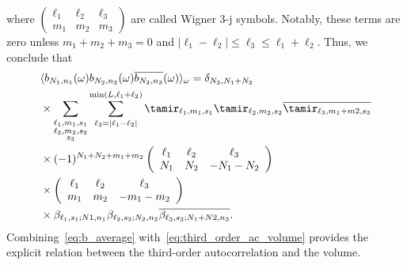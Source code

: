 \documentclass[9pt,twocolumn,twoside,lineno]{pnas-new}
\begin{document}
where  $\left(\begin{array}{ccc} \ell_1 & \ell_2 & \ell_3\\ m_1 & m_2 & m_3\end{array}\right)$ are called Wigner 3-j symbols. 
Notably, these terms are zero unless $m_1+m_2+m_3=0$ and $|\ell_1-\ell_2|\leq \ell_3\leq \ell_1+\ell_2$. Thus,  we conclude that 
\begin{align} \label{eq:b_average}
&\langle b_{N_1,n_1}(\omega)b_{N_2,n_2}(\omega)\overline{b_{N_3,n_3}}(\omega)\rangle_{\omega} = \delta_{N_3,N_1+N_2}\\&\times \sum_{\substack{\ell_1,m_1,s_1\\\ell_2,m_2,s_2\\s_3}}\sum_{\ell_3=|\ell_1-\ell_2|}^{\min(L,\ell_1+\ell_2)}\tamir_{\ell_1,m_1,s_1}\tamir_{\ell_2,m_2,s_2}\overline{\tamir_{\ell_3,m_1+m2,s_3}}\nonumber\\
&\times (-1)^{N_1+N_2+m_1+m_2}\left(\begin{array}{ccc}\ell_1 & \ell_2  & \ell_3\\ N_1 & N_2 & -N_1-N_2\end{array}\right)\\&\times \left(\begin{array}{ccc}\ell_1 & \ell_2  & \ell_3\\ m_1 & m_2 & -m_1-m_2\end{array}\right)\\
&\times \beta_{\ell_1,s_1;N1,n_1}\beta_{\ell_2,s_2;N_2,n_2}\overline{\beta_{\ell_3,s_3;N_1+N2,n_3}}. \nonumber
\end{align}
Combining~\eqref{eq:b_average} with~\eqref{eq:third_order_ac_volume} provides the explicit relation between the third-order autocorrelation and the volume.   
\end{document}
